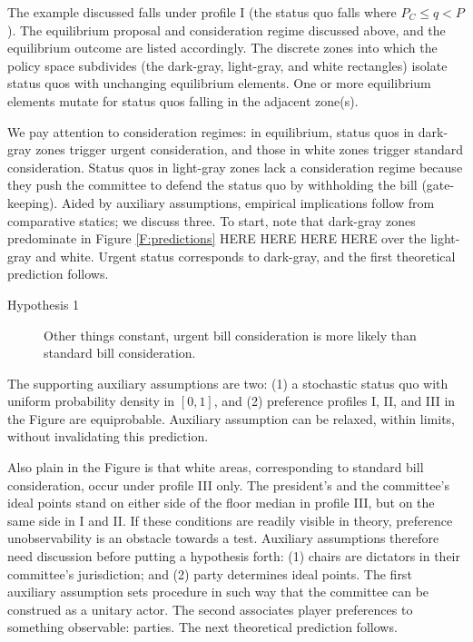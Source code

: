 \documentclass[letter,12pt]{article}
\begin{document}
The example discussed falls under profile I (the status quo falls where $P_C \leq q < P$). The equilibrium proposal and consideration regime discussed above, and the equilibrium outcome are listed accordingly. The discrete zones into which the policy space subdivides (the dark-gray, light-gray, and white rectangles) isolate status quos with unchanging equilibrium elements. One or more equilibrium elements mutate for status quos falling in the adjacent zone(s).

We pay attention to consideration regimes: in equilibrium, status quos in dark-gray zones trigger urgent consideration, and those in white zones trigger standard consideration. Status quos in light-gray zones lack a consideration regime because they push the committee to defend the status quo by withholding the bill (gate-keeping). Aided by auxiliary assumptions, empirical implications follow from comparative statics; we discuss three. To start, note that dark-gray zones predominate in Figure \ref{F:predictions} HERE HERE HERE HERE over the light-gray and white. Urgent status corresponds to dark-gray, and the first theoretical prediction follows.

\begin{description}
  \item [Hypothesis 1] Other things constant, urgent bill consideration is more likely than standard bill consideration. 
\end{description}
    
\noindent The supporting auxiliary assumptions are two: (1) a stochastic status quo with uniform probability density in $[0,1]$, and (2) preference profiles I, II, and III in the Figure are equiprobable. Auxiliary assumption can be relaxed, within limits, without invalidating this prediction. 

Also plain in the Figure is that white areas, corresponding to standard bill consideration, occur under profile III only. The president's and the committee's ideal points stand on either side of the floor median in profile III, but on the same side in I and II. If these conditions are readily visible in theory, preference unobservability is an obstacle towards a test. Auxiliary assumptions therefore need discussion before putting a hypothesis forth: (1) chairs are dictators in their committee's jurisdiction; and (2) party determines ideal points. The first auxiliary assumption sets procedure in such way that the committee can be construed as a unitary actor. The second associates player preferences to something observable: parties. The next theoretical prediction follows. 
\end{document}
